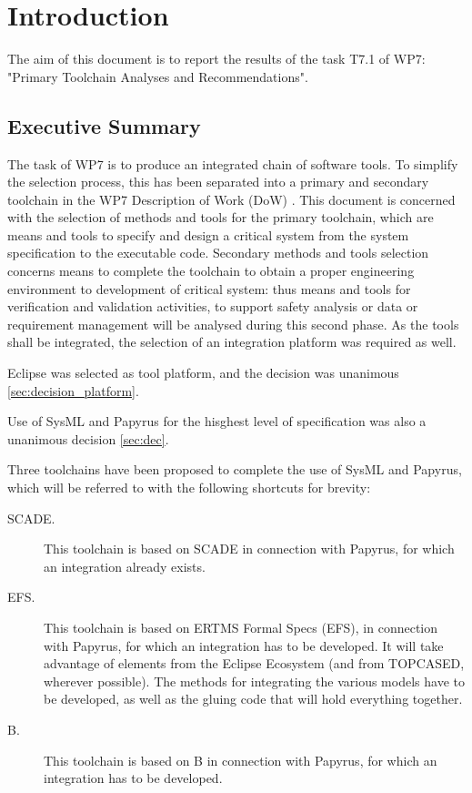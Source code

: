 

\chapter{Introduction}
\label{sec:intro}

The aim of this document is to report the results of the task T7.1 of WP7:  "Primary Toolchain Analyses and Recommendations".

\section{Executive Summary}

The task of WP7 is to produce an integrated chain of software tools.  To simplify the selection process, this has been separated into a primary and secondary toolchain in the WP7 Description of Work (DoW) \citep{WP7_D01}.  This document is concerned with the selection of methods and tools for the primary toolchain, which are means and tools to specify and design a critical system from the system specification to the executable code. Secondary methods and tools selection concerns means to complete the toolchain to obtain a proper engineering environment to  development of critical system: thus means and tools for verification and  validation activities, to support safety analysis or data or requirement management will be analysed during this second phase.  As the tools shall be integrated, the selection of an integration platform was required as well.

Eclipse was selected as tool platform, and the decision was unanimous \ref{sec:decision_platform}.

Use of SysML and Papyrus for the hisghest level of specification was also a unanimous decision \ref{sec:dec}. 

Three toolchains have been proposed to complete the use of SysML and Papyrus, which will be referred to with the following shortcuts for brevity:

\begin{description}
\item[SCADE.] This toolchain is based on SCADE in connection with Papyrus, for which an integration already exists.

\item[EFS.] This toolchain is based on ERTMS Formal Specs (EFS), in connection with Papyrus, for which an integration has to be developed.  It will take advantage of elements from the Eclipse Ecosystem (and from TOPCASED, wherever possible).  The methods for integrating the various models have to be developed, as well as the gluing code that will hold everything together.

\item[B.] This toolchain is based on B in connection with Papyrus, for which an integration has to be developed.

\end{description}


